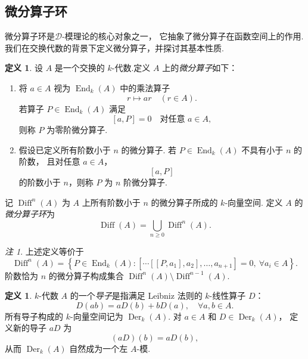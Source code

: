 \documentclass[11pt]{article}
\theoremstyle{plain}
\theoremstyle{definition}
\newtheorem{definition}[theorem]{定义}
\theoremstyle{remark}
\newtheorem{remark}[theorem]{注}
\newcommand{\End}{\operatorname{End}}
\newcommand{\Der}{\operatorname{Der}}
\begin{document}
\subsection{微分算子环}
微分算子环是$\mathcal{D}$-模理论的核心对象之一，
它抽象了微分算子在函数空间上的作用. 我们在交换代数的背景下定义微分算子，并探讨其基本性质.
\begin{definition}
    设 $A$ 是一个交换的 $k$-代数.定义 $A$ 上的\emph{微分算子}如下：
    \begin{enumerate}[label=(\roman*)]
        \item
              将 $a \in A$ 视为 $\End_k(A)$ 中的乘法算子
              \[
                  r \longmapsto ar \quad (r \in A).
              \]
              若算子 $P \in \End_k(A)$ 满足
              \[
                  [a,P]=0 \quad \text{对任意 } a\in A,
              \]
              则称 $P$ 为零阶微分算子.

        \item
              假设已定义所有阶数小于 $n$ 的微分算子.
              若 $P \in \End_k(A)$ 不具有小于 $n$ 的阶数，
              且对任意 $a \in A$，
              \[
                  [a,P]
              \]
              的阶数小于 $n$，则称 $P$ 为 $n$ 阶微分算子.
    \end{enumerate}
    记 $\operatorname{Diff}^n(A)$ 为 $A$ 上所有阶数小于 $n$
    的微分算子所成的 $k$-向量空间.
    定义 $A$ 的\emph{微分算子环}为
    \[
        \operatorname{Diff}(A)
        =
        \bigcup_{n \geq 0} \operatorname{Diff}^n(A).
    \]
\end{definition}

\begin{remark}
    上述定义等价于
    \[
        \operatorname{Diff}^n(A)
        =
        \left\{
        P \in \End_k(A)
        :
        [\cdots[[P,a_1],a_2],\ldots,a_{n+1}] = 0,
        \ \forall a_i \in A
        \right\}.
    \]
    阶数恰为 $n$ 的微分算子构成集合
    $\operatorname{Diff}^n(A)\setminus \operatorname{Diff}^{n-1}(A)$.
\end{remark}


\begin{definition}
    $k$-代数 $A$ 的一个\emph{导子}是指满足 Leibniz 法则的
    $k$-线性算子 $D$：
    \[
        D(ab)=aD(b)+bD(a),
        \quad \forall a,b\in A.
    \]
    所有导子构成的 $k$-向量空间记为 $\Der_k(A)$.
    对 $a \in A$ 和 $D \in \Der_k(A)$，
    定义新的导子 $aD$ 为
    \[
        (aD)(b)=aD(b),
    \]
    从而 $\Der_k(A)$ 自然成为一个左 $A$-模.
\end{definition}
\end{document}
